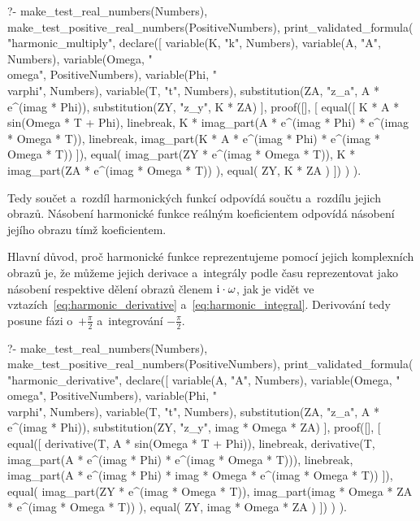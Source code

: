 \begin{prolog}
?-	make_test_real_numbers(Numbers),
	make_test_positive_real_numbers(PositiveNumbers),
	print_validated_formula(
		"harmonic_multiply",
		declare([
			variable(K, "k", Numbers),
			variable(A, "A", Numbers),
			variable(Omega, "\\omega", PositiveNumbers),
			variable(Phi, "\\varphi", Numbers),
			variable(T, "t", Numbers),
			substitution(ZA, "z_a", A * e^(imag * Phi)),
			substitution(ZY, "z_y", K * ZA)
		],
			proof([],
			[
				equal([
					K * A * sin(Omega * T + Phi),
					linebreak,
					K * imag_part(A * e^(imag * Phi) * e^(imag * Omega * T)),
					linebreak,
					imag_part(K * A * e^(imag * Phi) * e^(imag * Omega * T))
				]),
				equal(
					imag_part(ZY * e^(imag * Omega * T)),
					K * imag_part(ZA * e^(imag * Omega * T))
				),
				equal(
					ZY,
					K * ZA
				)
			])
		)
	).
\end{prolog}

Tedy součet a~rozdíl harmonických funkcí odpovídá součtu a~rozdílu jejich obrazů. Násobení harmonické funkce reálným koeficientem odpovídá násobení jejího obrazu tímž koeficientem.

Hlavní důvod, proč harmonické funkce reprezentujeme pomocí jejich komplexních obrazů je, že můžeme jejich derivace a~integrály podle času reprezentovat jako násobení respektive dělení obrazů členem \(\mathrm{i} \cdot \omega\), jak je vidět ve vztazích~\eqref{eq:harmonic_derivative} a~\eqref{eq:harmonic_integral}. Derivování tedy posune fázi o~\(+\frac{\pi}{2}\) a~integrování \(-\frac{\pi}{2}\).

\begin{prolog}
?-	make_test_real_numbers(Numbers),
	make_test_positive_real_numbers(PositiveNumbers),
	print_validated_formula(
		"harmonic_derivative",
		declare([
			variable(A, "A", Numbers),
			variable(Omega, "\\omega", PositiveNumbers),
			variable(Phi, "\\varphi", Numbers),
			variable(T, "t", Numbers),
			substitution(ZA, "z_a", A * e^(imag * Phi)),
			substitution(ZY, "z_y", imag * Omega * ZA)
		],
			proof([],
			[
				equal([
					derivative(T, A * sin(Omega * T + Phi)),
					linebreak,
					derivative(T, imag_part(A * e^(imag * Phi) * e^(imag * Omega * T))),
					linebreak,
					imag_part(A * e^(imag * Phi) * imag * Omega * e^(imag * Omega * T))
				]),
				equal(
					imag_part(ZY * e^(imag * Omega * T)),
					imag_part(imag * Omega * ZA * e^(imag * Omega * T))
				),
				equal(
					ZY,
					imag * Omega * ZA
				)
			])
		)
	).
\end{prolog}



